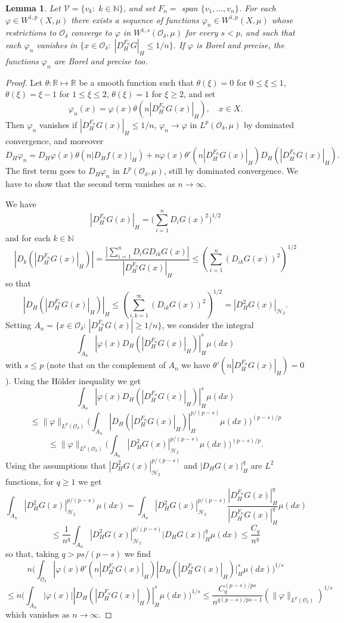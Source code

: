 \documentclass[reqno,twoside,12pt]{amsart}
\newtheorem{Lemma}[Theorem]{Lemma}
\begin{document}
\begin{Lemma}
\label{Le:approssimazione}
Let $\mathcal V = \{ v_k:\;k\in {\mathbb N}\}$, and set $  F_n =$  span $\{v_1, \ldots, v_n\}$. 
For each  $\varphi \in W^{1,p}(X, \mu)$ there exists a sequence of functions $\varphi_n\in W^{1,p}(X, \mu)$ whose restrictions to ${\mathcal O}_{\delta}$ converge to $\varphi $ in $ W^{1,s}({\mathcal O}_{\delta}, \mu)$ for every $s<p$, 
and such that each $\varphi_n$ vanishes in $\{x\in {\mathcal O}_{\delta}:\; |D_H^{F_n}G|_H\leq 1/n\}$.  If $\varphi $ is Borel and precise, the functions $\varphi_n$ are Borel and precise too. 
\end{Lemma}
\begin{proof}
Let  $\theta: {\mathbb R}\mapsto {\mathbb R}$ be a smooth function such that $\theta(\xi) = 0$ for $0\leq \xi\leq 1$, $\theta(\xi) = \xi-1$ for $1\leq \xi\leq 2$, $\theta(\xi) = 1$ for $\xi \geq 2$, and set 
$$\varphi_n(x) = \varphi(x) \theta (n|D_H^{F_n}G(x)|_H), \quad x\in X. $$
Then $\varphi_n$ vanishes if $|D_H^{F_n}G(x)|_H\leq 1/n$,   
$\varphi_n\to \varphi $ in  $L^{p}({\mathcal O}_{\delta},\mu)$ by dominated convergence, and moreover
$$D_H\varphi_n = D_H\varphi(x) \theta (n|D_Hf(x)|_H) + n \varphi(x)\theta'(n|D_H^{F_n}G(x)|_H) D_H(|D_H^{F_n}G(x)|_H).$$
 The first term goes to   $D_H\varphi_n$ in  $L^{p}({\mathcal O}_{\delta},\mu)$, still by dominated convergence. We have to show that the second term vanishes as $n\to \infty$. 

 We have
$$|D_H^{F_n}G(x)|_H = \bigg(\sum_{i=1}^{n} D_iG(x)^2\bigg)^{1/2}$$
and for each  $k\in {\mathbb N}$
$$|D_k(|D_H^{F_n}G(x)|_H)| = \frac{|\sum_{i=1}^{n} D_iGD_{ik}G(x)|}{|D_H^{F_n}G(x)|_H} \leq 
( \sum_{i=1}^{n} (D_{ik}G(x))^2)^{1/2}$$
so that 
$$|D_H(|D_H^{F_n}G(x)|_H)|_H \leq ( \sum_{i,k=1}^{\infty} (D_{ik}G(x))^2)^{1/2} = |D^2_HG(x)|_{{\mathcal H}_2}. $$
Setting $A_n = \{x\in {\mathcal O}_{\delta}:\, |D_H^{F_n}G(x)| \geq 1/n\}$, we consider the integral
$$\int_{A_n}| \varphi(x) D_H(|D_H^{F_n}G(x)|_H)|_H^s\mu(dx) $$
with  $s\leq p$ (note that on the complement of $A_n$ we have $\theta'(n|D_H^{F_n}G(x)|_H)=0$). Using the H\"older inequality we get
$$\int_{A_n}| \varphi(x) D_H(|D_H^{F_n}G(x)|_H)|_H^s\mu(dx) $$
$$\leq \|\varphi\|_{L^p({\mathcal O}_\delta)} \bigg(\int_{A_n}| D_H(|D_H^{F_n}G(x)|_H)|_{H}^{p/(p-s)}\mu(dx) \bigg)^{(p-s)/p}$$
$$ \leq  \|\varphi\|_{L^p({\mathcal O}_\delta)} \bigg( \int_{A_n}  |D^2_HG(x)|_{{\mathcal H}_2}^{p/(p-s)}\mu(dx) \bigg)^{(p-s)/p} .
$$
Using the assumptions that $|D^2_HG(x)|_{{\mathcal H}_2}^{p/(p-s)}$ and $ |D_H G(x)|_H^q$ are  $L^2$ functions, 
 for $q\geq 1$ we get
$$\int_{A_n}  |D^2_HG(x)|_{{\mathcal H}_2}^{p/(p-s)}\mu(dx)  = \int_{A_n}  |D^2_HG(x)|_{{\mathcal H}_2}^{p/(p-s)}\frac{|D_H^{F_n}G(x)|_H^q}{|D_H^{F_n}G(x)|_H^q}\mu(dx) $$
$$\leq \frac{1}{n^q} 
\int_{A_n}  |D^2_HG(x)|_{{\mathcal H}_2}^{p/(p-s)} |D_H G(x)|_H^q \mu(dx)
\leq \frac{C_q}{n^q}$$
so that, taking  $q >ps/(p-s) $ we find
$$n \bigg(\int_{{\mathcal O}_{\delta}} |\varphi(x)\theta'(n|D_H^{F_n}G(x)|_H) |D_H(|D_H^{F_n}G(x)|_H)|_{H}^s\mu(dx) \bigg)^{1/s}$$
$$\leq 
n \bigg(\int_{A_n} | \varphi(x)| |D_H(|D_H^{F_n}G(x)|_H)|_{H}^s\mu(dx) \bigg)^{1/s}\leq 
\frac{C_q^{(p-s)/ps}}{n^{q(p-s)/ps-1}}(\|\varphi\|_{L^p({\mathcal O}_{\delta})})^{1/s}$$
which vanishes as $n\to \infty$. 
\end{proof}
\end{document}

